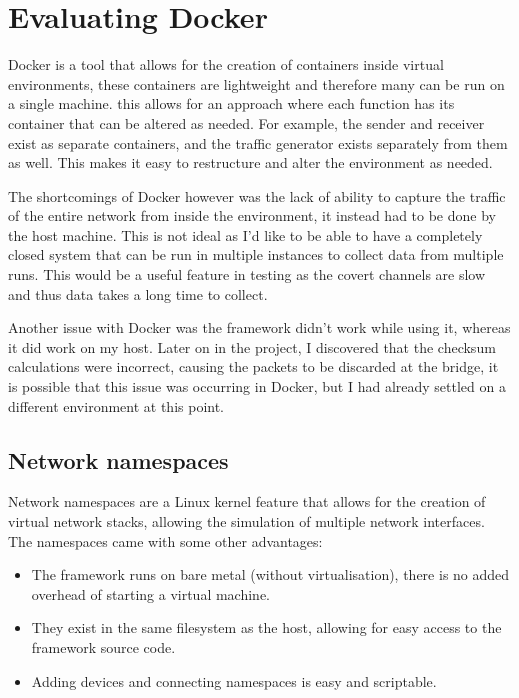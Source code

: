 \section{Evaluating Docker}

Docker \citep{docker} is a tool that allows for the creation of containers inside virtual environments, these containers are lightweight and therefore many can be run on a single machine. this allows for an approach where each function has its container that can be altered as needed. For example, the sender and receiver exist as separate containers, and the traffic generator exists separately from them as well. This makes it easy to restructure and alter the environment as needed.

The shortcomings of Docker however was the lack of ability to capture the traffic of the entire network from inside the environment, it instead had to be done by the host machine. This is not ideal as I'd like to be able to have a completely closed system that can be run in multiple instances to collect data from multiple runs. This would be a useful feature in testing as the covert channels are slow and thus data takes a long time to collect.

Another issue with Docker was the framework didn't work while using it, whereas it did work on my host. Later on in the project, I discovered that the checksum calculations were incorrect, causing the packets to be discarded at the bridge, it is possible that this issue was occurring in Docker, but I had already settled on a different environment at this point.

\subsection{Network namespaces}

Network namespaces are a Linux kernel feature that allows for the creation of virtual network stacks, allowing the simulation of multiple network interfaces. The namespaces came with some other advantages:

\begin{itemize}
    \item The framework runs on bare metal (without virtualisation), there is no added overhead of starting a virtual machine.
    \item They exist in the same filesystem as the host, allowing for easy access to the framework source code.
    \item Adding devices and connecting namespaces is easy and scriptable.
\end{itemize}

